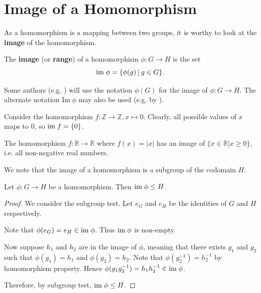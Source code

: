 \section{Image of a Homomorphism}
As a homomorphism is a mapping between two groups, it is worthy to look at the \textbf{image} of the homomorphism.
\begin{definition}
    The \textbf{image} (or \textbf{range}) of a homomorphism $\phi: G \to H$ is the set
    \[
        \im\phi = \{\phi(g) \vert g \in G\}.
    \]
\end{definition}
\begin{remark}
    Some authors (e.g. \cite{libretexts_imandker}) will use the notation $\phi(G)$ for the image of $\phi: G \to H$. The alternate notation $\mathrm{Im}\;\phi$ may also be used (e.g. by \cite{clark_1984, hungerford_1980}).
\end{remark}

\begin{example}
    Consider the homomorphism $f: \mathbb{Z} \to \mathbb{Z}, x \mapsto 0$. Clearly, all possible values of $x$ maps to 0, so $\mathrm{im}\; f = \{0\}$.
\end{example}
\begin{example}
    The homomorphism $f: \mathbb{R} \to \mathbb{R}$ where $f(x) = |x|$ has an image of $\{x \in \mathbb{R} \vert x \geq 0\}$, i.e. all non-negative real numbers.
\end{example}

\newpage

We note that the image of a homomorphism is a subgroup of the codomain $H$.
\begin{proposition}\label{prop-image-is-subgroup-of-codomain}
    Let $\phi: G \to H$ be a homomorphism. Then $\mathrm{im}\;\phi \leq H$.
\end{proposition}
\begin{proof}
    We consider the subgroup test. Let $e_G$ and $e_H$ be the identities of $G$ and $H$ respectively.
    
    Note that $\phi(e_G) = e_H \in \mathrm{im}\;\phi$. Thus $\mathrm{im}\;\phi$ is non-empty.
    
    Now suppose $h_1$ and $h_2$ are in the image of $\phi$, meaning that there exists $g_1$ and $g_2$ such that $\phi(g_1) = h_1$ and $\phi(g_2) = h_2$. Note that $\phi(g_2^{-1}) = h_2^{-1}$ by homomorphism property. Hence $\phi(g_1g_2^{-1}) = h_1h_2^{-1} \in \mathrm{im}\;\phi$.

    Therefore, by subgroup test, $\mathrm{im}\;\phi \leq H$.
\end{proof}

